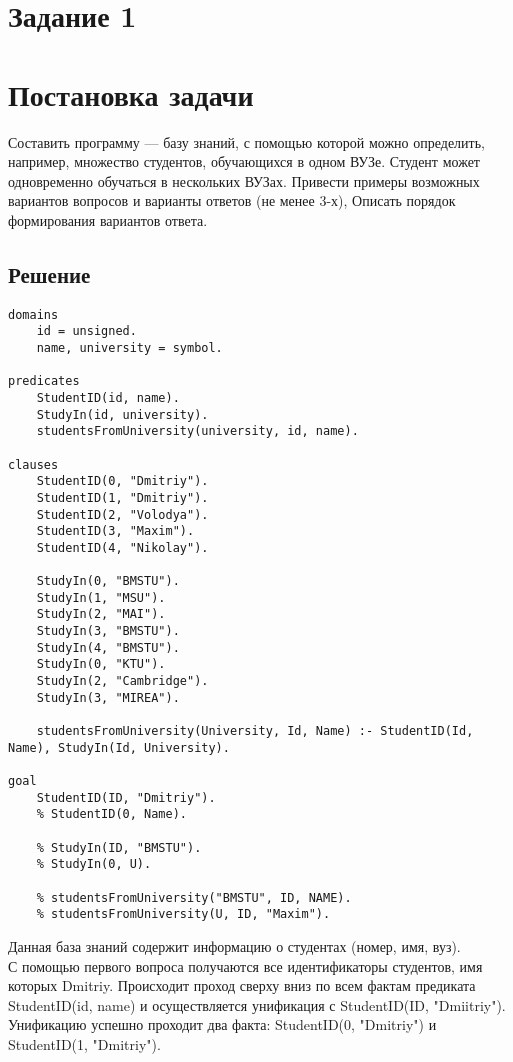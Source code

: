 \section*{Задание 1}
\section*{Постановка задачи}

Составить программу — базу знаний, с помощью которой можно определить, например, множество студентов, обучающихся в одном ВУЗе. Студент может одновременно обучаться в нескольких ВУЗах. Привести примеры возможных вариантов вопросов и варианты ответов (не менее 3-х), Описать порядок формирования вариантов ответа.

\subsection*{Решение}
\begin{lstlisting}
domains
    id = unsigned.
    name, university = symbol.

predicates
    StudentID(id, name).
    StudyIn(id, university).
    studentsFromUniversity(university, id, name).

clauses
    StudentID(0, "Dmitriy").
    StudentID(1, "Dmitriy").
    StudentID(2, "Volodya").
    StudentID(3, "Maxim").
    StudentID(4, "Nikolay").

    StudyIn(0, "BMSTU").
    StudyIn(1, "MSU").
    StudyIn(2, "MAI").
    StudyIn(3, "BMSTU").
    StudyIn(4, "BMSTU").
    StudyIn(0, "KTU").
    StudyIn(2, "Cambridge").
    StudyIn(3, "MIREA").

    studentsFromUniversity(University, Id, Name) :- StudentID(Id, Name), StudyIn(Id, University).

goal
    StudentID(ID, "Dmitriy").
    % StudentID(0, Name).

    % StudyIn(ID, "BMSTU").
    % StudyIn(0, U).

    % studentsFromUniversity("BMSTU", ID, NAME).
    % studentsFromUniversity(U, ID, "Maxim").
\end{lstlisting}

Данная база знаний содержит информацию о студентах (номер, имя, вуз).\\

С помощью первого вопроса получаются все идентификаторы студентов, имя которых Dmitriy. Происходит проход сверху вниз по всем фактам
предиката StudentID(id, name) и осуществляется унификация с
StudentID(ID, "Dmiitriy"). Унификацию успешно проходит два факта:
StudentID(0, "Dmitriy") и StudentID(1, "Dmitriy").

